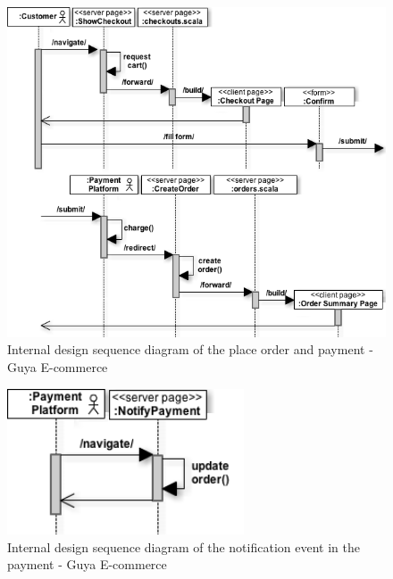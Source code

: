 \begin{figure}[!h]
\center
\includegraphics[keepaspectratio, width=15cm]{sequence-diagrams/order-and-payment.png}
\caption{Internal design sequence diagram of the place order and payment - Guya E-commerce}
\end{figure}

\begin{figure}[!h]
\center
\includegraphics[keepaspectratio, width=7cm]{sequence-diagrams/payment-notification.png}
\caption{Internal design sequence diagram of the notification event in the payment - Guya E-commerce}
\end{figure}

